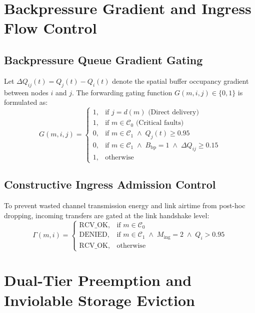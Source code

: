 \documentclass[journal,compsoc]{IEEEtran}
\begin{document}
\section{Backpressure Gradient and Ingress Flow Control}

\subsection{Backpressure Queue Gradient Gating}
Let $\Delta Q_{ij}(t) = Q_j(t) - Q_i(t)$ denote the spatial buffer occupancy gradient between nodes $i$ and $j$. The forwarding gating function $G(m, i, j) \in \{0, 1\}$ is formulated as:
\begin{equation}
G(m, i, j) = \begin{cases}
1, & \text{if } j = d(m) \text{ (Direct delivery)} \\[2pt]
1, & \text{if } m \in \mathcal{C}_0 \text{ (Critical faults)} \\[2pt]
0, & \text{if } m \in \mathcal{C}_1 \;\land\; Q_j(t) \ge 0.95 \\[2pt]
0, & \text{if } m \in \mathcal{C}_1 \;\land\; B_{\mathrm{bp}} = 1 \;\land\; \Delta Q_{ij} \ge 0.15 \\[2pt]
1, & \text{otherwise}
\end{cases}
\end{equation}

\subsection{Constructive Ingress Admission Control}
To prevent wasted channel transmission energy and link airtime from post-hoc dropping, incoming transfers are gated at the link handshake level:
\begin{equation}
\Gamma(m, i) = \begin{cases}
\mathrm{RCV\_OK}, & \text{if } m \in \mathcal{C}_0 \\[2pt]
\mathrm{DENIED}, & \text{if } m \in \mathcal{C}_1 \;\land\; M_{\mathrm{ing}} = 2 \;\land\; Q_i > 0.95 \\[2pt]
\mathrm{RCV\_OK}, & \text{otherwise}
\end{cases}
\end{equation}

\section{Dual-Tier Preemption and Inviolable Storage Eviction}
\end{document}
